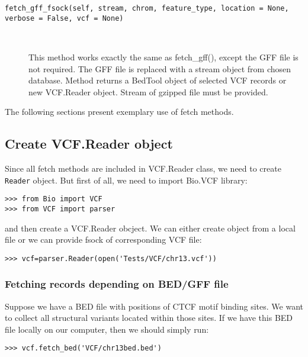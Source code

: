 \begin{description}
  \item[\texttt{fetch\_gff\_fsock(self, stream, chrom, feature\_type, location = None, verbose = False, vcf = None)}] \

    This method works exactly the same as fetch\_gff(), except the GFF file is not required.
    The GFF file is replaced with a stream object from chosen database.
    Method returns a BedTool object of selected VCF records or new VCF.Reader object.
    Stream of gzipped file must be provided.

\end{description}


\noindent The following sections present exemplary use of fetch methods.


\subsection{Create VCF.Reader object}
\label{sec:object}


\noindent Since all fetch methods are included in VCF.Reader class, we need to create \verb|Reader| object. But first of all,
we need to import Bio.VCF library:


\begin{verbatim}
>>> from Bio import VCF
>>> from VCF import parser

\end{verbatim}

\noindent and then create a VCF.Reader obcject. We can either create object from a local file or we can provide fsock
of corresponding VCF file:


\begin{verbatim}
>>> vcf=parser.Reader(open('Tests/VCF/chr13.vcf'))

\end{verbatim}

\subsubsection{Fetching records depending on BED/GFF file}


\noindent Suppose we have a BED file with positions of CTCF motif binding sites. We want to collect all structural variants
located within those sites. If we have this BED file locally on our computer, then we should simply run:


\begin{verbatim}
>>> vcf.fetch_bed('VCF/chr13bed.bed')

\end{verbatim}



